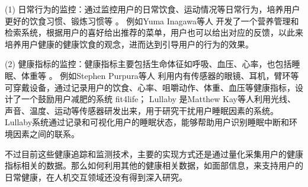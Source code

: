 (1) 日常行为的监控：通过监控用户的日常饮食、运动情况等日常行为，培养用户更好的饮食习惯、锻炼习惯等 \cite{purpura2011fit4life} \cite{Inagawa2013A} \cite{bravata2007using} \cite{cordeiro2015barriers} \cite{lin2006fish} \cite{miller2014stepstream}。 例如Yuma Inagawa等人  \cite{Inagawa2013A} 开发了一个营养管理和检索系统，根据用户的喜好给出推荐的菜单，用户也可以给出对应的反馈，以此来培养用户健康的健康饮食的观念，进而达到引导用户的行为的效果。


(2) 健康指标的监控：健康指标主要包括生命体征如呼吸、血压、心率，也包括睡眠、体重等 \cite{kay2012lullaby} \cite{gronvall2013beyond} \cite{logan2007mobile} \cite{walters2010a}。
例如Stephen Purpura等人 \cite{purpura2011fit4life} 利用内有传感器的眼镜、耳机，臂环等可穿戴设备，通过记录用户的饮食、心率、咀嚼动作、体重、血压等健康指标，设计了一个鼓励用户减肥的系统 fit4life； 
Lullaby  \cite{kay2012lullaby} 是Matthew Kay等人利用光线、声音、温度、运动等传感器研发出来，用于研究干扰用户睡眠因素的系统。
Lullaby系统通过记录和可视化用户的睡眠状态，能够帮助用户识别睡眠中断和环境因素之间的联系。 


不过目前这些健康追踪和监测技术，主要的实现方式还是通过量化采集用户的健康指标相关的数据。那么如何利用其他的健康相关数据，如面部信息，来支持用户的日常健康，在人机交互领域还没有得到深入研究。




 
